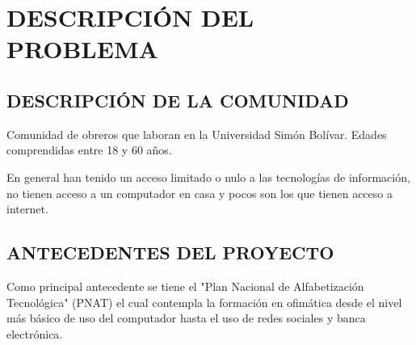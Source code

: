 	\section{DESCRIPCIÓN DEL PROBLEMA}
    
		\subsection{DESCRIPCIÓN DE LA COMUNIDAD}
			Comunidad de obreros que laboran en la Universidad Simón Bolívar. Edades comprendidas entre 18 y 60 años.
            
            En general han tenido un acceso limitado o nulo a las tecnologías de información, no tienen acceso a un computador en casa y pocos son los que tienen acceso a internet.
            
		\subsection{ANTECEDENTES DEL PROYECTO}
            Como principal antecedente se tiene el "Plan Nacional de Alfabetización Tecnológica" (PNAT) el cual contempla la formación en ofimática desde el nivel más básico de uso del computador hasta el uso de redes sociales y banca electrónica.
            
	\pagebreak